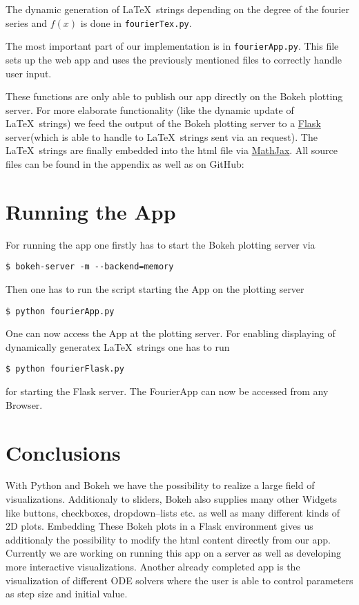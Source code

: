 \documentclass[a4paper,pdftex]{scrartcl}
\begin{document}
The dynamic generation of \LaTeX\ strings depending on the degree of the fourier series and $f(x)$ is done in \verb!fourierTex.py!.

The most important part of our implementation is in \verb!fourierApp.py!. This file sets up the web app and uses the previously mentioned files to correctly handle user input.

These functions are only able to publish our app directly on the Bokeh plotting server. For more elaborate functionality (like the dynamic update of \LaTeX\ strings) we feed the output of the Bokeh plotting server to a \href{}{Flask} server(which is able to handle to \LaTeX\ strings sent via an request). The \LaTeX\ strings are finally embedded into the html file via \href{https://www.mathjax.org/}{MathJax}.
All source files can be found in the appendix as well as on GitHub: \href{}{}

\section{Running the App}
For running the app one firstly has to start the Bokeh plotting server via
\begin{verbatim}
$ bokeh-server -m --backend=memory
\end{verbatim}
Then one has to run the script starting the App on the plotting server
\begin{verbatim}
$ python fourierApp.py
\end{verbatim}
One can now access the App at the plotting server. For enabling displaying of dynamically generatex \LaTeX\ strings one has to run
\begin{verbatim}
$ python fourierFlask.py
\end{verbatim}
for starting the Flask server. The FourierApp can now be accessed from any Browser.

\section{Conclusions}
With Python and Bokeh we have the possibility to realize a large field of visualizations. Additionaly to sliders, Bokeh also supplies many other Widgets like buttons, checkboxes, dropdown--lists etc. as well as many different kinds of 2D plots.
Embedding These Bokeh plots in a Flask environment gives us additionaly the possibility to modify the html content directly from our app.
Currently we are working on running this app on a server as well as developing more interactive visualizations. Another already completed app is the visualization of different ODE solvers where the user is able to control parameters as step size and initial value.
\end{document}
